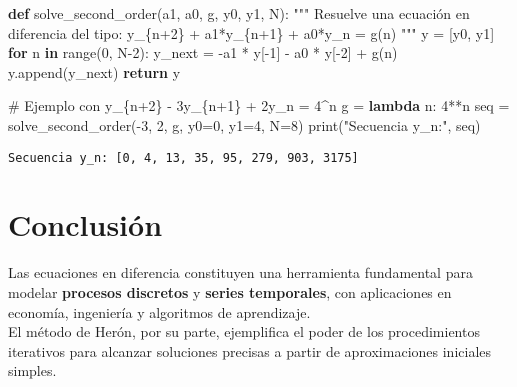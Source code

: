 \documentclass[
  letterpaper,
  DIV=11,
  numbers=noendperiod]{scrreprt}
\newenvironment{Shaded}{\begin{snugshade}}{\end{snugshade}}
\newcommand{\BuiltInTok}[1]{\textcolor[rgb]{0.00,0.23,0.31}{#1}}
\newcommand{\CommentTok}[1]{\textcolor[rgb]{0.37,0.37,0.37}{#1}}
\newcommand{\ControlFlowTok}[1]{\textcolor[rgb]{0.00,0.23,0.31}{\textbf{#1}}}
\newcommand{\DecValTok}[1]{\textcolor[rgb]{0.68,0.00,0.00}{#1}}
\newcommand{\KeywordTok}[1]{\textcolor[rgb]{0.00,0.23,0.31}{\textbf{#1}}}
\newcommand{\NormalTok}[1]{\textcolor[rgb]{0.00,0.23,0.31}{#1}}
\newcommand{\OperatorTok}[1]{\textcolor[rgb]{0.37,0.37,0.37}{#1}}
\newcommand{\StringTok}[1]{\textcolor[rgb]{0.13,0.47,0.30}{#1}}
\begin{document}
\begin{Shaded}
\begin{Highlighting}[]
\KeywordTok{def}\NormalTok{ solve\_second\_order(a1, a0, g, y0, y1, N):}
    \CommentTok{"""}
\CommentTok{    Resuelve una ecuación en diferencia del tipo:}
\CommentTok{        y\_\{n+2\} + a1*y\_\{n+1\} + a0*y\_n = g(n)}
\CommentTok{    """}
\NormalTok{    y }\OperatorTok{=}\NormalTok{ [y0, y1]}
    \ControlFlowTok{for}\NormalTok{ n }\KeywordTok{in} \BuiltInTok{range}\NormalTok{(}\DecValTok{0}\NormalTok{, N}\OperatorTok{{-}}\DecValTok{2}\NormalTok{):}
\NormalTok{        y\_next }\OperatorTok{=} \OperatorTok{{-}}\NormalTok{a1 }\OperatorTok{*}\NormalTok{ y[}\OperatorTok{{-}}\DecValTok{1}\NormalTok{] }\OperatorTok{{-}}\NormalTok{ a0 }\OperatorTok{*}\NormalTok{ y[}\OperatorTok{{-}}\DecValTok{2}\NormalTok{] }\OperatorTok{+}\NormalTok{ g(n)}
\NormalTok{        y.append(y\_next)}
    \ControlFlowTok{return}\NormalTok{ y}

\CommentTok{\# Ejemplo con y\_\{n+2\} {-} 3y\_\{n+1\} + 2y\_n = 4\^{}n}
\NormalTok{g }\OperatorTok{=} \KeywordTok{lambda}\NormalTok{ n: }\DecValTok{4}\OperatorTok{**}\NormalTok{n}
\NormalTok{seq }\OperatorTok{=}\NormalTok{ solve\_second\_order(}\OperatorTok{{-}}\DecValTok{3}\NormalTok{, }\DecValTok{2}\NormalTok{, g, y0}\OperatorTok{=}\DecValTok{0}\NormalTok{, y1}\OperatorTok{=}\DecValTok{4}\NormalTok{, N}\OperatorTok{=}\DecValTok{8}\NormalTok{)}
\BuiltInTok{print}\NormalTok{(}\StringTok{"Secuencia y\_n:"}\NormalTok{, seq)}
\end{Highlighting}
\end{Shaded}

\begin{verbatim}
Secuencia y_n: [0, 4, 13, 35, 95, 279, 903, 3175]
\end{verbatim}

\section{Conclusión}\label{conclusiuxf3n}

Las ecuaciones en diferencia constituyen una herramienta fundamental
para modelar \textbf{procesos discretos} y \textbf{series temporales},
con aplicaciones en economía, ingeniería y algoritmos de aprendizaje.\\
El método de Herón, por su parte, ejemplifica el poder de los
procedimientos iterativos para alcanzar soluciones precisas a partir de
aproximaciones iniciales simples.

\end{document}
